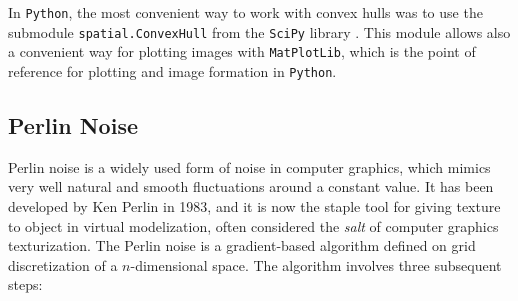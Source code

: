 In \texttt{Python}, the most convenient way to work with convex hulls was to use the submodule \texttt{spatial.ConvexHull} from the \texttt{SciPy} library \cite{2020SciPy-NMeth}. This module allows also a convenient way for plotting images with \texttt{MatPlotLib}, which is the point of reference for plotting and image formation in \texttt{Python}.

\subsection{Perlin Noise}
Perlin noise is a widely used form of noise in computer graphics, which mimics very well natural and smooth fluctuations around a constant value. It has been developed by Ken Perlin in 1983, and it is now the staple tool for giving texture to object in virtual modelization, often considered the \textit{salt} of computer graphics texturization.
The Perlin noise is a gradient-based algorithm defined on grid discretization of a $n$-dimensional space. The algorithm involves three subsequent steps:

